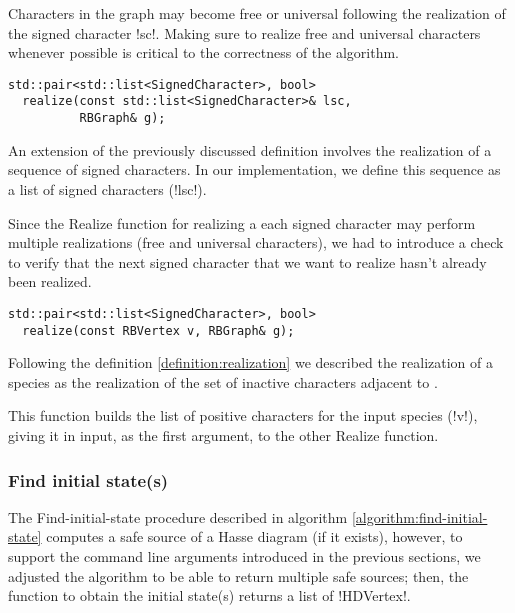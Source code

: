 Characters in the graph may become free or universal following the realization of the signed character !sc!.
Making sure to realize free and universal characters whenever possible is critical to the correctness of the algorithm.

\text{}

\begin{lstlisting}[moreemph={RBGraph, SignedCharacter},
                   moreemph={[2]realize}]
  std::pair<std::list<SignedCharacter>, bool>
  realize(const std::list<SignedCharacter>& lsc,
          RBGraph& g);
\end{lstlisting}

An extension of the previously discussed definition involves the realization of a sequence of signed characters.
In our implementation, we define this sequence as a list of signed characters \character[][\pm] (!lsc!).

Since the Realize function for realizing a each signed character may perform multiple realizations (free and universal characters), we had to introduce a check to verify that the next signed character that we want to realize hasn't already been realized.

\text{}

\begin{lstlisting}[moreemph={RBGraph, SignedCharacter, RBVertex},
                   moreemph={[2]realize}]
  std::pair<std::list<SignedCharacter>, bool>
  realize(const RBVertex v, RBGraph& g);
\end{lstlisting}

Following the definition \ref{definition:realization} we described the realization of a species \species[i] as the realization of the set of inactive characters adjacent to \species[i].

This function builds the list of positive characters \character[j][+] for the input species \species[i] (!v!), giving it in input, as the first argument, to the other Realize function.

\subsubsection{Find initial state(s)}\label{section:initial-state}

The Find-initial-state procedure described in algorithm \ref{algorithm:find-initial-state} computes a safe source of a Hasse diagram (if it exists), however, to support the command line arguments introduced in the previous sections, we adjusted the algorithm to be able to return multiple safe sources; then, the function to obtain the initial state(s) returns a list of !HDVertex!.

